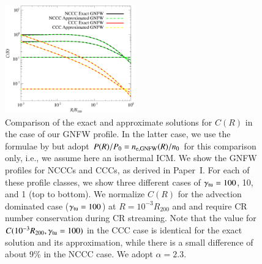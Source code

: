 \documentclass[useAMS,usenatbib]{mn2e}
\begin{document}
\begin{appendix}
\begin{figure}
\centering
\includegraphics[width=0.5\textwidth]{figures/CR_profiles_REXexactVSfake.eps}
\caption{Comparison of the exact and approximate solutions for $C(R)$ in the
  case of our GNFW profile. In the latter case, we use the formulae by
  \protect\cite{2011A&A...527A..99E} but adopt $P(R)/P_{0}=n_{{\mathrm{e,GNFW}}}(R)/n_{0}$
  for this comparison only, i.e., we assume here an isothermal ICM. We show the GNFW
  profiles for NCCCs and CCCs, as derived in Paper~I. For each of
  these profile classes, we show three different cases of
  $\gamma_{{\mathrm{tu}}}=100$, 10, and 1 (top to bottom). We normalize $C(R)$ for
  the advection dominated case ($\gamma_{{\mathrm{tu}}}=100$) at $R=10^{-3}R_{200}$
  and and require CR number conservation during CR streaming. Note that the
  value for $C(10^{-3}R_{200},\gamma_{{\mathrm{tu}}}=100)$ in the CCC case is
  identical for the exact solution and its approximation, while there is a small
  difference of about 9\% in the NCCC case. We adopt $\alpha=2.3$.}
\label{fig:REXexactVSfake}
\end{figure}


\end{appendix}
\end{document}

